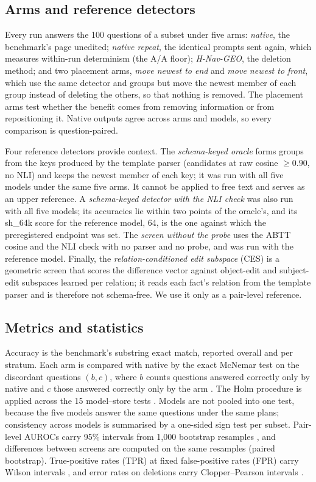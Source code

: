 \documentclass{CUP-JNL-NLP}
\newcommand{\sub}[1]{\textsf{sh\_#1}}                    %
\newcommand{\geo}{H-Nav-GEO}
\begin{document}
\subsection{Arms and reference detectors}
\label{sec:arms}

Every run answers the 100 questions of a subset under five arms: \emph{native}, the benchmark's page unedited; \emph{native repeat}, the identical prompts sent again, which measures within-run determinism (the A/A floor); \emph{\geo{}}, the deletion method; and two placement arms, \emph{move newest to end} and \emph{move newest to front}, which use the same detector and groups but move the newest member of each group instead of deleting the others, so that nothing is removed. The placement arms test whether the benefit comes from removing information or from repositioning it. Native outputs agree across arms and models, so every comparison is question-paired.

Four reference detectors provide context. The \emph{schema-keyed oracle} forms groups from the keys produced by the template parser (candidates at raw cosine $\ge0.90$, no NLI) and keeps the newest member of each key; it was run with all five models under the same five arms. It cannot be applied to free text and serves as an upper reference. A \emph{schema-keyed detector with the NLI check} was also run with all five models; its accuracies lie within two points of the oracle's, and its \sub{64k} score for the reference model, 64, is the one against which the preregistered endpoint was set. The \emph{screen without the probe} uses the ABTT cosine and the NLI check with no parser and no probe, and was run with the reference model. Finally, the \emph{relation-conditioned edit subspace} (CES) is a geometric screen that scores the difference vector against object-edit and subject-edit subspaces learned per relation; it reads each fact's relation from the template parser and is therefore not schema-free. We use it only as a pair-level reference.

\subsection{Metrics and statistics}
\label{sec:stats}

Accuracy is the benchmark's substring exact match, reported overall and per stratum. Each arm is compared with native by the exact McNemar test on the discordant questions $(b,c)$, where $b$ counts questions answered correctly only by native and $c$ those answered correctly only by the arm \citep{mcnemar1947note,dietterich1998approximate}. The Holm procedure is applied across the 15 model--store tests \citep{holm1979,dror2018hitchhiker}. Models are not pooled into one test, because the five models answer the same questions under the same plans; consistency across models is summarised by a one-sided sign test per subset. Pair-level AUROCs carry 95\% intervals from 1,000 bootstrap resamples \citep{efron1993bootstrap}, and differences between screens are computed on the same resamples (paired bootstrap). True-positive rates (TPR) at fixed false-positive rates (FPR) carry Wilson intervals \citep{wilson1927}, and error rates on deletions carry Clopper--Pearson intervals \citep{clopper1934}.
\end{document}
